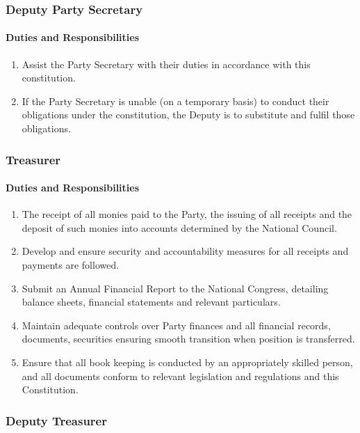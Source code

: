 \documentclass[a4paper,titlepage,8.5pt]{article}
\begin{document}
\subsubsection{Deputy Party Secretary}

\paragraph{Duties and Responsibilities}

\begin{enumerate}
\item Assist the Party Secretary with their duties in accordance with this constitution.
\item If the Party Secretary is unable (on a temporary basis) to conduct their obligations under the constitution, the Deputy is to substitute and fulfil those obligations.
\end{enumerate}

\subsubsection{Treasurer}

\paragraph{Duties and Responsibilities}

\begin{enumerate}
\item The receipt of all monies paid to the Party, the issuing of all receipts and the deposit of such monies into accounts determined by the National Council.
\item Develop and ensure security and accountability measures for all receipts and payments are followed.
\item Submit an Annual Financial Report to the National Congress, detailing balance sheets, financial statements and relevant particulars.
\item Maintain adequate controls over Party finances and all financial records, documents, securities ensuring smooth transition when position is transferred.
\item Ensure that all book keeping is conducted by an appropriately skilled person, and all documents conform to relevant legislation and regulations and this Constitution.
\end{enumerate}

\subsubsection{Deputy Treasurer}
\end{document}

